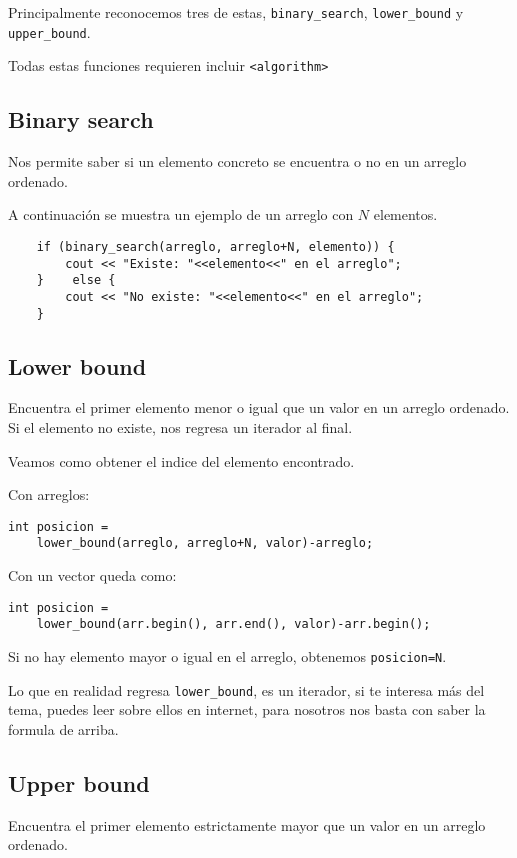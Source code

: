 Principalmente reconocemos tres de estas, \verb|binary_search|, \verb|lower_bound| y \verb|upper_bound|.

Todas estas funciones requieren incluir \verb|<algorithm>|
\subsection*{Binary search}

Nos permite saber si un elemento concreto se encuentra o no en un arreglo ordenado.

A continuación se muestra un ejemplo de un arreglo con \(N\) elementos.
\begin{lstlisting}
	if (binary_search(arreglo, arreglo+N, elemento)) {
		cout << "Existe: "<<elemento<<" en el arreglo";	
	}	 else {
		cout << "No existe: "<<elemento<<" en el arreglo";	
	}
\end{lstlisting}

\subsection*{Lower bound}
Encuentra el primer elemento menor o igual que un valor en un arreglo ordenado. Si el elemento no existe, nos regresa un iterador al final.

Veamos como obtener el indice del elemento encontrado.

Con arreglos:
\begin{small}
\begin{lstlisting}
int posicion = 
	lower_bound(arreglo, arreglo+N, valor)-arreglo;
\end{lstlisting}
\end{small}

Con un vector queda como:

\begin{small}
\begin{lstlisting}
int posicion = 
	lower_bound(arr.begin(), arr.end(), valor)-arr.begin();
\end{lstlisting}
\end{small}

Si no hay elemento mayor o igual en el arreglo, obtenemos \verb|posicion=N|.

Lo que en realidad regresa \verb|lower_bound|, es un iterador, si te interesa más del tema, puedes leer sobre ellos en internet, para nosotros nos basta con saber la formula de arriba.

\subsection*{Upper bound}
Encuentra el primer elemento estrictamente mayor que un valor en un arreglo ordenado. 

